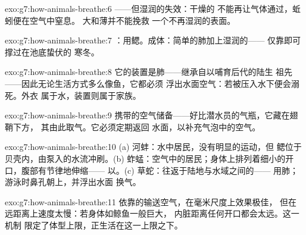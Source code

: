 \begin{solution}{exo:g7:how-animals-breathe:6}
——但湿润的失效：干燥的
不能再让气体通过，蚯蚓便在空气中窒息。
大和薄并不能挽救
一个不再湿润的表面。
\end{solution}

\begin{solution}{exo:g7:how-animals-breathe:7}
：用鳃。成体：简单的肺加上湿润的——
仅靠即可撑过在池底蛰伏的
寒冬。
\end{solution}

\begin{solution}{exo:g7:how-animals-breathe:8}
它的装置是肺——继承自以哺育后代的陆生
祖先——因此无论生活方式多么像鱼，它都必须
浮出水面空气：若被压入水下便会溺死。外衣
属于水，装置则属于家族。
\end{solution}

\begin{solution}{exo:g7:how-animals-breathe:9}
携带的空气储备——好比潜水员的气瓶，它藏在翅鞘下方，
其由此取气。它必须定期返回
水面，以补充气泡中的空气。
\end{solution}

\begin{solution}{exo:g7:how-animals-breathe:10}
(a) 河蚌：水中居民，没有明显的运动，但
鳃位于贝壳内，由泵入的水流冲刷。(b)
蚱蜢：空气中的居民；身体上排列着细小的开口，腹部有节律地伸缩——
以。(c) 草蛇：往返于陆地与水域之间的——
用肺；游泳时鼻孔朝上，并浮出水面
换气。
\end{solution}

\begin{solution}{exo:g7:how-animals-breathe:11}
依靠的输送空气，在毫米尺度上效果极佳，
但在远距离上速度太慢：若身体如鲸鱼一般巨大，
内脏距离任何开口都会太远。这一机制
限定了体型上限，正生活在这一上限之下。
\end{solution}

